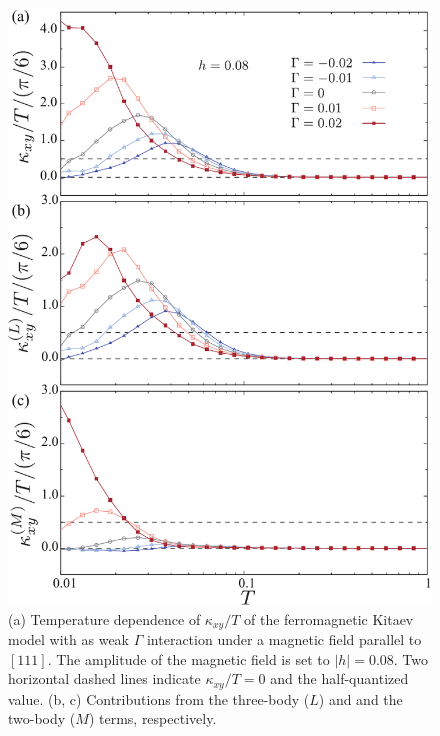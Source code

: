 \documentclass[reprint,amsmath,amssymb,aps,prx]{revtex4-2}
\begin{document}
\begin{figure}
  \begin{center}
    \includegraphics[width=0.9\linewidth]{plot_k_all_h0.08_G.pdf}
  \end{center}
  \caption{(a) Temperature dependence of $\kappa_{xy}/T$ of the ferromagnetic Kitaev model with as weak $\Gamma$ interaction under a magnetic field parallel to $[111]$. The amplitude of the magnetic field is set to $|h|=0.08$. Two horizontal dashed lines indicate $\kappa_{xy}/T = 0$ and the half-quantized value. (b, c) Contributions from the three-body ($L$) and and the two-body ($M$) terms, respectively.}
  \label{fig:k_all_h0.08_G}
\end{figure}
   
   
\end{document}

